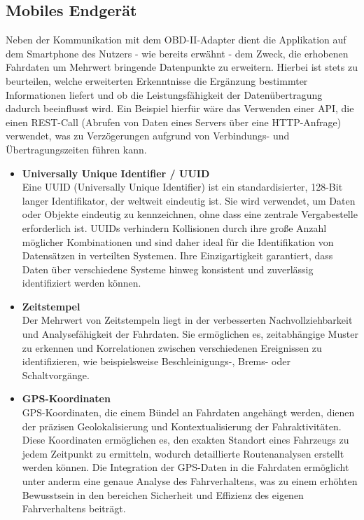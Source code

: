 \documentclass[oneside]{ausarbeitung}
\begin{document}
\subsection*{Mobiles Endgerät}
Neben der Kommunikation mit dem OBD-II-Adapter dient die Applikation auf dem Smartphone des Nutzers - wie bereits erwähnt - dem Zweck, die erhobenen Fahrdaten um Mehrwert bringende Datenpunkte zu erweitern.
Hierbei ist stets zu beurteilen, welche erweiterten Erkenntnisse die Ergänzung bestimmter Informationen liefert und ob die Leistungsfähigkeit der Datenübertragung dadurch beeinflusst wird. Ein Beispiel hierfür wäre das Verwenden einer API, die einen REST-Call (Abrufen von Daten eines Servers über eine HTTP-Anfrage) verwendet, was zu Verzögerungen aufgrund von Verbindungs- und Übertragungszeiten führen kann.
\begin{itemize}
  \item \textbf{Universally Unique Identifier / UUID} \\ Eine UUID (Universally Unique Identifier) ist ein standardisierter, 128-Bit langer Identifikator, der weltweit eindeutig ist. Sie wird verwendet, um Daten oder Objekte eindeutig zu kennzeichnen, ohne dass eine zentrale Vergabestelle erforderlich ist. UUIDs verhindern Kollisionen durch ihre große Anzahl möglicher Kombinationen und sind daher ideal für die Identifikation von Datensätzen in verteilten Systemen. Ihre Einzigartigkeit garantiert, dass Daten über verschiedene Systeme hinweg konsistent und zuverlässig identifiziert werden können.
  \item \textbf{Zeitstempel} \\ Der Mehrwert von Zeitstempeln liegt in der verbesserten Nachvollziehbarkeit und Analysefähigkeit der Fahrdaten. Sie ermöglichen es, zeitabhängige Muster zu erkennen und Korrelationen zwischen verschiedenen Ereignissen zu identifizieren, wie beispielsweise Beschleinigungs-, Brems- oder Schaltvorgänge.
  \item \textbf{GPS-Koordinaten} \\ GPS-Koordinaten, die einem Bündel an Fahrdaten angehängt werden, dienen der präzisen Geolokalisierung und Kontextualisierung der Fahraktivitäten. Diese Koordinaten ermöglichen es, den exakten Standort eines Fahrzeugs zu jedem Zeitpunkt zu ermitteln, wodurch detaillierte Routenanalysen erstellt werden können. Die Integration der GPS-Daten in die Fahrdaten ermöglicht unter anderm eine genaue Analyse des Fahrverhaltens, was zu einem erhöhten Bewusstsein in den bereichen Sicherheit und Effizienz des eigenen Fahrverhaltens beiträgt.
\end{itemize}
\end{document}

